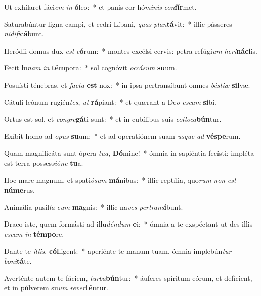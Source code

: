 \item Ut exhílaret fáci\textit{em} \textit{in} \textbf{ó}leo:~* et panis cor hó\textit{mi}\textit{nis} \textit{con}\textbf{fír}met.
\item Saturabúntur ligna campi, et cedri Líbani, \textit{quas} \textit{plan}\textbf{tá}vit:~* illic pásseres \textit{ni}\textit{di}\textit{fi}\textbf{cá}bunt.
\item Heródii domus dux \textit{est} \textit{e}\textbf{ó}rum:~* montes excélsi cervis: petra refúgi\textit{um} \textit{he}\textit{ri}\textbf{ná}\textbf{ci}is.
\item Fecit lu\textit{nam} \textit{in} \textbf{tém}pora:~* sol cognóvit \textit{oc}\textit{cá}\textit{sum} \textbf{su}um.
\item Posuísti ténebras, et \textit{fac}\textit{ta} \textbf{est} nox:~* in ipsa pertransíbunt omnes \textit{bés}\textit{ti}\textit{æ} \textbf{sil}væ.
\item Cátuli leónum rugién\textit{tes}, \textit{ut} \textbf{rá}piant:~* et quærant a De\textit{o} \textit{es}\textit{cam} \textbf{si}bi.
\item Ortus est sol, et \textit{con}\textit{gre}\textbf{gá}ti sunt:~* et in cubílibus suis \textit{col}\textit{lo}\textit{ca}\textbf{bún}tur.
\item Exíbit homo ad \textit{o}\textit{pus} \textbf{su}um:~* et ad operatiónem suam \textit{us}\textit{que} \textit{ad} \textbf{vés}\textbf{pe}rum.
\item Quam magnificáta sunt ópera \textit{tu}\textit{a}, \textbf{Dó}mine!~* ómnia in sapiéntia fecísti: impléta est terra posses\textit{si}\textit{ó}\textit{ne} \textbf{tu}a.
\item Hoc mare magnum, et spati\textit{ó}\textit{sum} \textbf{má}nibus:~* illic reptília, quo\textit{rum} \textit{non} \textit{est} \textbf{nú}\textbf{me}rus.
\item Animália pusíl\textit{la} \textit{cum} \textbf{ma}gnis:~* illic na\textit{ves} \textit{per}\textit{trans}\textbf{í}bunt.
\item Draco iste, quem formásti ad illu\textit{dén}\textit{dum} \textbf{e}i:~* ómnia a te exspéctant ut des illis \textit{es}\textit{cam} \textit{in} \textbf{tém}\textbf{po}re.
\item Dante te \textit{il}\textit{lis}, \textbf{cól}ligent:~* aperiénte te manum tuam, ómnia implebún\textit{tur} \textit{bo}\textit{ni}\textbf{tá}te.
\item Averténte autem te fáciem, \textit{tur}\textit{ba}\textbf{bún}tur:~* áuferes spíritum eórum, et defícient, et in púlverem su\textit{um} \textit{re}\textit{ver}\textbf{tén}tur.
